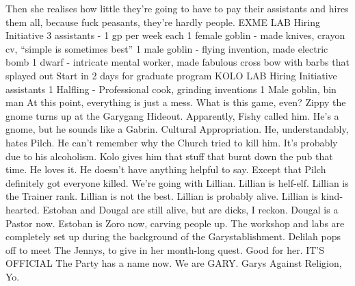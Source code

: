 Then she realises how little they’re going to have to pay their assistants and hires them all, because fuck peasants, they’re hardly people.\medskip
EXME LAB Hiring Initiative 3 assistants - 1 gp per week each 1 female goblin - made knives, crayon cv, “simple is sometimes best” 1 male goblin - flying invention, made electric bomb 1 dwarf - intricate mental worker, made fabulous cross bow with barbs that splayed out\medskip
Start in 2 days for graduate program\medskip
KOLO LAB Hiring Initiative assistants 1 Halfling - Professional cook, grinding inventions 1 Male goblin, bin man\medskip
At this point, everything is just a mess.\medskip
What is this game, even?\medskip
Zippy the gnome turns up at the Garygang Hideout. Apparently, Fishy called him. He’s a gnome, but he sounds like a Gabrin. Cultural Appropriation.\medskip
He, understandably, hates Pilch.\medskip
He can’t remember why the Church tried to kill him. It’s probably due to his alcoholism.\medskip
Kolo gives him that stuff that burnt down the pub that time.\medskip
He loves it.\medskip
He doesn’t have anything helpful to say.\medskip
Except that Pilch definitely got everyone killed.\medskip
We’re going with Lillian.\medskip
Lillian is helf-elf.\medskip
Lillian is the Trainer rank.\medskip
Lillian is not the best.\medskip
Lillian is probably alive.\medskip
Lillian is kind-hearted.\medskip
Estoban and Dougal are still alive, but are dicks, I reckon. Dougal is a Pastor now. Estoban is Zoro now, carving people up.\medskip
The workshop and labs are completely set up during the background of the Garystablishment.\medskip
Delilah pops off to meet The Jennys, to give in her month-long quest. Good for her.\medskip
IT’S OFFICIAL The Party has a name now. We are GARY. Garys Against Religion, Yo.